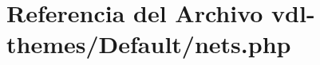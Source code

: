 \hypertarget{nets_8php}{\section{Referencia del Archivo vdl-\/themes/\-Default/nets.php}
\label{nets_8php}
}
